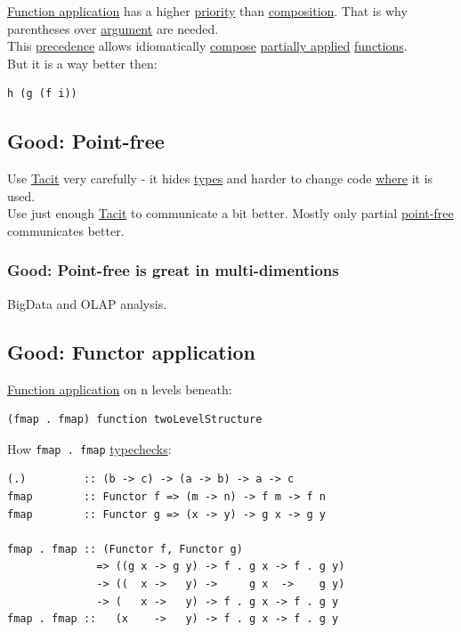 \documentclass[11pt]{article}
\begin{document}
\hyperref[org6aac242]{Function application} has a higher \hyperref[org8cf8667]{priority} than \hyperref[orga128e7f]{composition}. That is why parentheses over \hyperref[orga6b7e97]{argument} are needed.\\
This \hyperref[orgb0d1e87]{precedence} allows idiomatically \hyperref[org5956f19]{compose} \hyperref[org23a90a6]{partially applied} \hyperref[orgaa8fb87]{functions}.\\

But it is a way better then:\\
\begin{verbatim}
h (g (f i))
\end{verbatim}

\subsection{\label{orgc0ce6f8}Good: Point-free}
\label{sec:orgf7497e0}
Use \hyperref[org76a9852]{Tacit} very carefully - it hides \hyperref[org4209edd]{types} and harder to change code \hyperref[org3e5903d]{where} it is used.\\
Use just enough \hyperref[org76a9852]{Tacit} to communicate a bit better. Mostly only partial \hyperref[org1638f37]{point-free} communicates better.\\

\subsubsection{\label{org2df2403}Good: Point-free is great in multi-dimentions}
\label{sec:org99955d8}
BigData and OLAP analysis.\\

\subsection{\label{orgef3bbd0}Good: Functor application}
\label{sec:org7d35a72}
\hyperref[org6aac242]{Function application} on n levels beneath:\\
\begin{verbatim}
(fmap . fmap) function twoLevelStructure
\end{verbatim}

How \texttt{fmap . fmap} \hyperref[org1f5fd94]{typechecks}:\\
\begin{verbatim}
(.)         :: (b -> c) -> (a -> b) -> a -> c
fmap        :: Functor f => (m -> n) -> f m -> f n
fmap        :: Functor g => (x -> y) -> g x -> g y

fmap . fmap :: (Functor f, Functor g)
              => ((g x -> g y) -> f . g x -> f . g y)
              -> ((  x ->   y) ->     g x  ->    g y)
              -> (   x ->   y) -> f . g x -> f . g y
fmap . fmap ::   (x    ->   y) -> f . g x -> f . g y
\end{verbatim}
\end{document}
